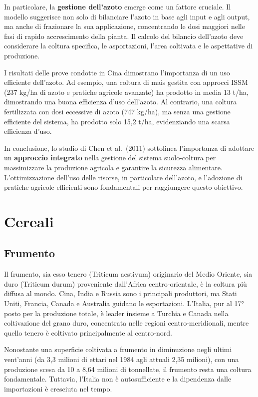 \documentclass[
]{book}
\theoremstyle{definition}
\theoremstyle{definition}
\theoremstyle{definition}
\theoremstyle{definition}
\theoremstyle{remark}
\begin{document}
In particolare, la \textbf{gestione dell'azoto} emerge come un fattore cruciale. Il modello suggerisce non solo di bilanciare l'azoto in base agli input e agli output, ma anche di frazionare la sua applicazione, concentrando le dosi maggiori nelle fasi di rapido accrescimento della pianta. Il calcolo del bilancio dell'azoto deve considerare la coltura specifica, le asportazioni, l'area coltivata e le aspettative di produzione.

I risultati delle prove condotte in Cina dimostrano l'importanza di un uso efficiente dell'azoto. Ad esempio, una coltura di mais gestita con approcci ISSM (237 kg/ha di azoto e pratiche agricole avanzate) ha prodotto in media 13 t/ha, dimostrando una buona efficienza d'uso dell'azoto. Al contrario, una coltura fertilizzata con dosi eccessive di azoto (747 kg/ha), ma senza una gestione efficiente del sistema, ha prodotto solo 15,2 t/ha, evidenziando una scarsa efficienza d'uso.

In conclusione, lo studio di Chen et al.~(2011) sottolinea l'importanza di adottare un \textbf{approccio integrato} nella gestione del sistema suolo-coltura per massimizzare la produzione agricola e garantire la sicurezza alimentare. L'ottimizzazione dell'uso delle risorse, in particolare dell'azoto, e l'adozione di pratiche agricole efficienti sono fondamentali per raggiungere questo obiettivo.

\hypertarget{cereali}{%
\section{Cereali}\label{cereali}}

\hypertarget{frumento}{%
\subsection{Frumento}\label{frumento}}

Il frumento, sia esso tenero (Triticum aestivum) originario del Medio Oriente, sia duro (Triticum durum) proveniente dall'Africa centro-orientale, è la coltura più diffusa al mondo. Cina, India e Russia sono i principali produttori, ma Stati Uniti, Francia, Canada e Australia guidano le esportazioni. L'Italia, pur al 17° posto per la produzione totale, è leader insieme a Turchia e Canada nella coltivazione del grano duro, concentrata nelle regioni centro-meridionali, mentre quello tenero è coltivato principalmente al centro-nord.

Nonostante una superficie coltivata a frumento in diminuzione negli ultimi vent'anni (da 3,3 milioni di ettari nel 1984 agli attuali 2,35 milioni), con una produzione scesa da 10 a 8,64 milioni di tonnellate, il frumento resta una coltura fondamentale. Tuttavia, l'Italia non è autosufficiente e la dipendenza dalle importazioni è cresciuta nel tempo.
\end{document}
